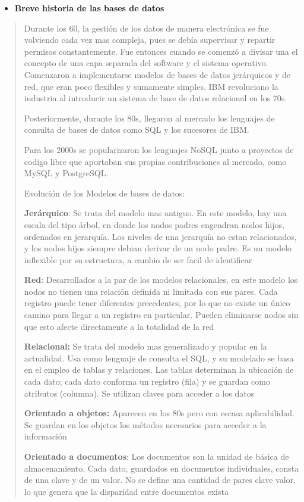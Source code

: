 \documentclass[14pt]{extarticle}
\begin{document}
\begin{itemize}
\item
  \textbf{Breve historia de las bases de datos}
\end{itemize}

\begin{quote}
Durante los 60, la gestión de los datos de manera electrónica se fue
volviendo cada vez mas compleja, pues se debía supervisar y repartir
permisos constantemente. Fue entonces cuando se comenzó a divisar una el
concepto de una capa separada del software y el sistema operativo.
Comenzaron a implementarse modelos de bases de datos jerárquicos y de
red, que eran poco flexibles y sumamente simples. IBM revoluciono la
industria al introducir un sistema de base de datos relacional en los
70s.

Posteriormente, durante los 80s, llegaron al mercado los lenguajes de
consulta de bases de datos como SQL y los sucesores de IBM.

Para los 2000s se popularizaron los lenguajes NoSQL junto a proyectos de
codigo libre que aportaban sus propias contribuciones al mercado, como
MySQL y PostgreSQL.

Evolución de los Modelos de bases de datos:

\textbf{Jerárquico}: Se trata del modelo mas antiguo. En este modelo,
hay una escala del tipo árbol, en donde los nodos padres engendran nodos
hijos, ordenados en jerarquía. Los niveles de una jerarquía no estan
relacionados, y los nodos hijos siempre debian derivar de un nodo padre.
Es un modelo inflexible por su estructura, a cambio de ser facil de
identificar

\textbf{Red}: Desarrollados a la par de los modelos relacionales, en
este modelo los nodos no tienen una relación definida ni limitada con
sus pares. Cada registro puede tener diferentes precedentes, por lo que
no existe un único camino para llegar a un registro en particular.
Pueden eliminarse nodos sin que esto afecte directamente a la totalidad
de la red

\textbf{Relacional:} Se trata del modelo mas generalizado y popular en
la actualidad. Usa como lenguaje de consulta el SQL, y su modelado se
basa en el empleo de tablas y relaciones. Las tablas determinan la
ubicación de cada dato; cada dato conforma un registro (fila) y se
guardan como atributos (columna). Se utilizan claves para acceder a los
datos

\textbf{Orientado a objetos:} Aparecen en los 80s pero con escasa
aplicabilidad. Se guardan en los objetos los métodos necesarios para
acceder a la información

\textbf{Orientado a documentos}: Los documentos son la unidad de básica
de almacenamiento. Cada dato, guardados en documentos individuales,
consta de una clave y de un valor. No se define una cantidad de pares
clave valor, lo que genera que la disparidad entre documentos exista
\end{quote}
\end{document}
